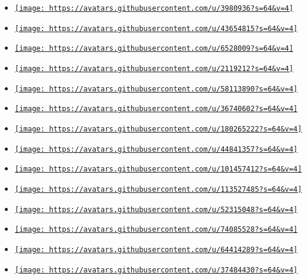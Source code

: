 \begin{itemize}
\item
  \href{https://github.com/gabriel-araujjo}{\texttt{[image: https://avatars.githubusercontent.com/u/3980936?s=64\&v=4]}}
\item
  \href{https://github.com/istudyatuni}{\texttt{[image: https://avatars.githubusercontent.com/u/43654815?s=64\&v=4]}}
\item
  \href{https://github.com/jbirnick}{\texttt{[image: https://avatars.githubusercontent.com/u/6528009?s=64\&v=4]}}
\item
  \href{https://github.com/jsoref}{\texttt{[image: https://avatars.githubusercontent.com/u/2119212?s=64\&v=4]}}
\item
  \href{https://github.com/mattfbacon}{\texttt{[image: https://avatars.githubusercontent.com/u/58113890?s=64\&v=4]}}
\item
  \href{https://github.com/mtoohey31}{\texttt{[image: https://avatars.githubusercontent.com/u/36740602?s=64\&v=4]}}
\item
  \href{https://github.com/nz366}{\texttt{[image: https://avatars.githubusercontent.com/u/180265222?s=64\&v=4]}}
\item
  \href{https://github.com/omniwrench}{\texttt{[image: https://avatars.githubusercontent.com/u/44841357?s=64\&v=4]}}
\item
  \href{https://github.com/shinyfelix}{\texttt{[image: https://avatars.githubusercontent.com/u/101457412?s=64\&v=4]}}
\item
  \href{https://github.com/tulio240}{\texttt{[image: https://avatars.githubusercontent.com/u/113527485?s=64\&v=4]}}
\item
  \href{https://github.com/3w36zj6}{\texttt{[image: https://avatars.githubusercontent.com/u/52315048?s=64\&v=4]}}
\item
  \href{https://github.com/AnarchistHoneybun}{\texttt{[image: https://avatars.githubusercontent.com/u/74085528?s=64\&v=4]}}
\item
  \href{https://github.com/Bzero}{\texttt{[image: https://avatars.githubusercontent.com/u/64414289?s=64\&v=4]}}
\item
  \href{https://github.com/Heinenen}{\texttt{[image: https://avatars.githubusercontent.com/u/37484430?s=64\&v=4]}}

\end{itemize}
